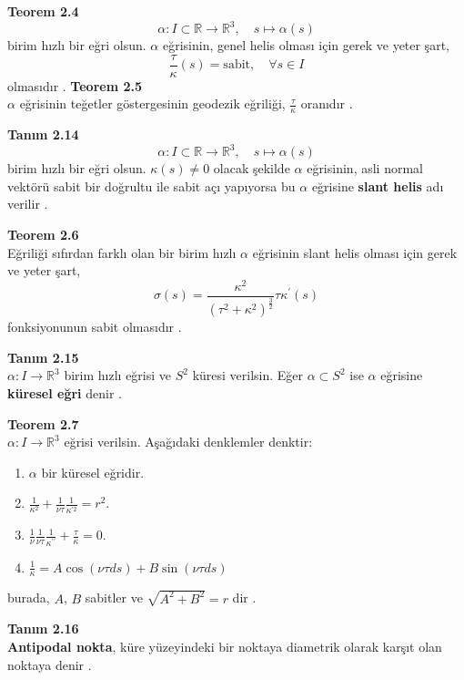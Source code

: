 \documentclass[a4paper,12pt]{article}
\begin{document}
\textbf{Teorem 2.4} \\ 
\[
\alpha: I \subset \mathbb{R} \to \mathbb{R}^3, \quad s \mapsto \alpha(s)
\]
birim hızlı bir eğri olsun. $\alpha$ eğrisinin, genel helis olması için gerek ve yeter şart,
\[
\frac{\tau}{\kappa}(s) = \text{sabit}, \quad \forall s \in I
\]
olmasıdır \cite{ref}.
\textbf{Teorem 2.5} \\
$\alpha$ eğrisinin teğetler göstergesinin geodezik eğriliği, $\frac{\tau}{\kappa}$ oranıdır \cite{ref}.

\textbf{Tanım 2.14} \\
\[
\alpha: I \subset \mathbb{R} \to \mathbb{R}^3, \quad s \mapsto \alpha(s)
\]
birim hızlı bir eğri olsun. $\kappa(s) \neq 0$ olacak şekilde $\alpha$ eğrisinin, asli normal vektörü sabit bir doğrultu ile sabit açı yapıyorsa bu $\alpha$ eğrisine \textbf{slant helis} adı verilir \cite{ref2}.

\textbf{Teorem 2.6} \\
Eğriliği sıfırdan farklı olan bir birim hızlı $\alpha$ eğrisinin slant helis olması için gerek ve yeter şart,
\[
\sigma(s) = \frac{\kappa^2}{(\tau^2 + \kappa^2)^{\frac{3}{2}}} \tau \kappa^\prime(s)
\]
fonksiyonunun sabit olmasıdır \cite{ref2}.

\textbf{Tanım 2.15} \\
$\alpha: I \to \mathbb{R}^3$ birim hızlı eğrisi ve $S^2$ küresi verilsin. Eğer $\alpha \subset S^2$ ise $\alpha$ eğrisine \textbf{küresel eğri} denir \cite{ref}.

\textbf{Teorem 2.7} \\
$\alpha: I \to \mathbb{R}^3$ eğrisi verilsin. Aşağıdaki denklemler denktir:
\begin{enumerate}
    \item $\alpha$ bir küresel eğridir.
    \item $\frac{1}{\kappa^2} + \frac{1}{\nu \tau} \frac{1}{\kappa^{\prime 2}} = r^2$.
    \item $\frac{1}{\nu} \frac{1}{\nu \tau} \frac{1}{\kappa^{\prime \prime}} + \frac{\tau}{\kappa} = 0$.
    \item $\frac{1}{\kappa} = A \cos (\nu \tau ds) + B \sin (\nu \tau ds)$
    \end{enumerate}
burada, $A$, $B$ sabitler ve $\sqrt{A^2 + B^2} = r$ dir \cite{ref3}.

\textbf{Tanım 2.16} \\
\textbf{Antipodal nokta}, küre yüzeyindeki bir noktaya diametrik olarak karşıt olan noktaya denir \cite{ref4}.
\end{document}

